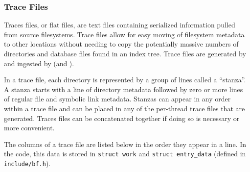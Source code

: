 \subsubsection{Trace Files}
\label{sec:tracefiles}
Traces files, or flat files, are text files containing
serialized \lstat information pulled from source filesystems. Trace
files allow for easy moving of filesystem metadata to other locations
without needing to copy the potentially massive numbers of directories
and database files found in an index tree. Trace files are generated
by \gufidirtrace and ingested by \gufitraceindex (and \gufitracedir).

In a trace file, each directory is represented by a group of lines
called a ``stanza''. A stanza starts with a line of directory metadata
followed by zero or more lines of regular file and symbolic link
metadata. Stanzas can appear in any order within a trace file and can
be placed in any of the per-thread trace files that are generated.
Traces files can be concatenated together if doing so is necessary or
more convenient.

The columns of a trace file are listed below in the order they appear
in a line. In the code, this data is stored in \texttt{struct~work}
and \texttt{struct~entry\_data} (defined in \texttt{include/bf.h}).

